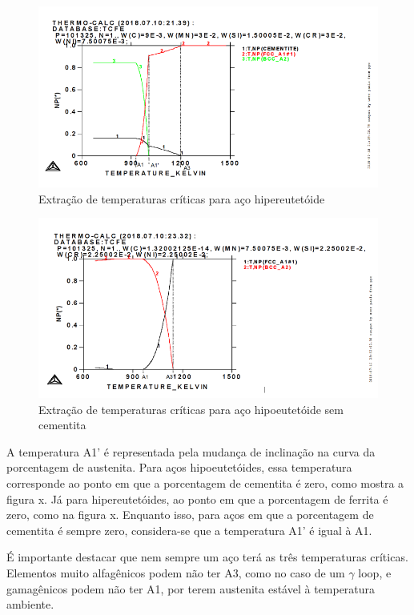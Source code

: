 \documentclass[brazil,dissertacao,epusp]{usp}
\begin{document}
\begin{figure}
  \includegraphics[width=.9\textwidth]{img/4321editado.png}
  \caption{Extração de temperaturas críticas para aço hipereutetóide}
  \label{fig:Tcrit_liga_hiper}
\end{figure}

\begin{figure}
  \includegraphics[width=.9\textwidth]{img/418editado.png}
  \caption{Extração de temperaturas críticas para aço hipoeutetóide sem cementita}
  \label{fig:Tcrit_liga_sem_cementita}
\end{figure}

A temperatura A1' é representada pela mudança de inclinação na curva da porcentagem de austenita. Para aços hipoeutetóides, essa temperatura corresponde ao ponto em que a porcentagem de cementita é zero, como mostra a figura x. Já para hipereutetóides, ao ponto em que a porcentagem de ferrita é zero, como na figura x. Enquanto isso, para aços em que a porcentagem de cementita é sempre zero, considera-se que a temperatura A1' é igual à A1.

É importante destacar que nem sempre um aço terá as três temperaturas críticas. Elementos muito alfagênicos podem não ter A3, como no caso de um $\gamma$ loop, e gamagênicos podem não ter A1, por terem austenita estável à temperatura ambiente.
\end{document}
